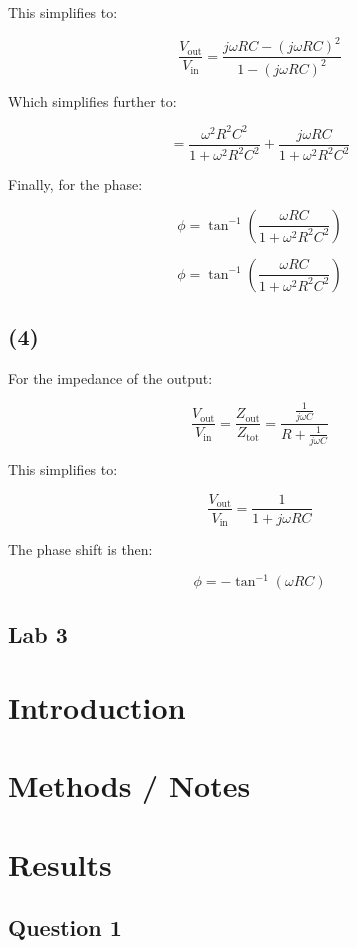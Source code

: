 \documentclass{article}
\begin{document}
This simplifies to:

\[
\frac{V_{\text{out}}}{V_{\text{in}}} = \frac{j \omega RC - (j \omega RC)^2}{1 - (j \omega RC)^2}
\]

Which simplifies further to:

\[
= \frac{\omega^2 R^2 C^2}{1 + \omega^2 R^2 C^2} + \frac{j \omega RC}{1 + \omega^2 R^2 C^2}
\]

Finally, for the phase:

\[
\phi = \tan^{-1} \left( \frac{\omega RC}{1 + \omega^2 R^2 C^2} \right)
\]

\[
\phi = \tan^{-1} \left( \frac{\omega RC}{1 + \omega^2 R^2 C^2} \right)
\]

\subsection{(4) }
For the impedance of the output:

\[
\frac{V_{\text{out}}}{V_{\text{in}}} = \frac{Z_{\text{out}}}{Z_{\text{tot}}} = \frac{\frac{1}{j \omega C}}{R + \frac{1}{j \omega C}}
\]

This simplifies to:

\[
\frac{V_{\text{out}}}{V_{\text{in}}} = \frac{1}{1 + j \omega RC}
\]

The phase shift is then:

\[
\phi = -\tan^{-1}(\omega RC)
\]


\begin{center}
    \section*{Lab 3}
\end{center}

\section{Introduction}

\section{Methods / Notes}

\section{Results}

\subsection{ Question 1 }
\end{document}
